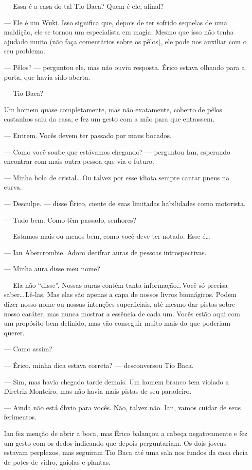 --- Essa é a casa do tal Tio Baca? Quem é ele, afinal?

--- Ele é um Wuki. Isso significa que, depois de ter sofrido sequelas de uma
maldição, ele se tornou um especialista em magia. Mesmo que isso não tenha
ajudado muito (não faça comentários sobre os pêlos), ele pode nos auxiliar com
o seu problema.

--- Pêlos? --- perguntou ele, mas não ouviu resposta. Érico estava olhando para
a porta, que havia sido aberta.

--- Tio Baca?

Um homem quase completamente, mas não exatamente, coberto de pêlos castanhos
saiu da casa, e fez um gesto com a mão para que entrassem.

--- Entrem. Vocês devem ter passado por maus bocados.

--- Como você soube que estávamos chegando? --- perguntou Ian, esperando
encontrar com mais outra pessoa que via o futuro.

--- Minha bola de cristal\ldots\,Ou talvez por esse idiota sempre cantar pneus
na curva.

--- Desculpe. --- disse Érico, ciente de suas limitadas habilidades como
motorista.

--- Tudo bem. Como têm passado, senhores?

--- Estamos mais ou menos bem, como você deve ter notado. Esse é\ldots

--- Ian Abercrombie. Adoro decifrar auras de pessoas introspectivas.

--- Minha aura disse meu nome?

--- Ela não “disse”. Nossas auras contêm tanta informação\ldots\,Você só
precisa saber\ldots\,Lê-las. Mas elas são apenas a capa de nossos livros
biomágicos. Podem dizer nosso nome ou nossas intenções superficiais, até mesmo
dar pistas sobre nosso caráter, mas nunca mostrar a essência de cada um. Vocês
estão aqui com um propósito bem definido, mas vão conseguir muito mais do que
poderiam querer.

--- Como assim?

--- Érico, minha dica estava correta? --- desconversou Tio Baca.

--- Sim, mas havia chegado tarde demais. Um homem branco tem violado a Diretriz
Monteiro, mas não havia mais pistas de seu paradeiro.

--- Ainda não está óbvio para vocês. Não, talvez não. Ian, vamos cuidar de seus
ferimentos.

Ian fez menção de abrir a boca, mas Érico balançou a cabeça negativamente e fez
um gesto com os dedos indicando que depois perguntariam. Os dois jovens estavam
perplexos, mas seguiram Tio Baca até uma sala nos fundos da casa cheia de potes
de vidro, gaiolas e plantas.

